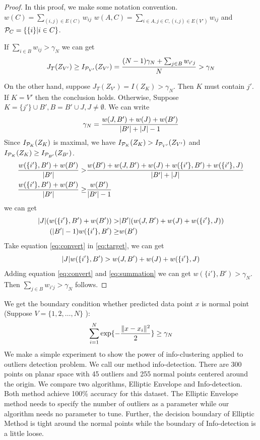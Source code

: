 \documentclass{article}
\begin{document}
\begin{proof}
	In this proof, we make some notation convention.
	$w(C) = \sum_{(i,j) \in E(C)} w_{ij}$
	$w(A, C) = \sum_{i \in A, j \in C, (i,j) \in E(V')} w_{ij}$ and
	$\P_C = \{\{i \}| i \in C \}$.
	
	If $ \sum_{i \in B} w_{ij} > \gamma_N$ we can get
$$
J_{T}(Z_{V'}) \geq I_{\P_{V'}}(Z_{V'}) = \frac{(N-1)\gamma_N + \sum_{j \in B}w_{i'j}}{N} > \gamma_N
$$

On the other hand, suppose $J_{T}(Z_{V'}) = I(Z_K) > \gamma_N$. Then $K$ must contain $j'$. If $K=V'$ then the conclusion holds. Otherwise, Suppose $K = \{j'\} \cup B', B=B'\cup J, J\neq \emptyset$. We can write 
\begin{equation}
\gamma_N = \frac{w(J,B') + w(J) + w(B')}{ \abs{B'} + \abs{J} - 1 }
\end{equation}
Since $I_{\P_K}(Z_K)$ is maximal, we have $I_{\P_K}(Z_K) > I_{\P_{V'}}(Z_{V'})$ and $I_{\P_K}(Z_K) \geq I_{\P_{B'}}(Z_{B'})$.
\begin{align*}
	\frac{w(\{i'\}, B') + w(B')}{\abs{B'}} >& \frac{w(B') + w(J, B') + w(J) + w(\{i'\}, B') + w(\{i'\}, J)}{\abs{B'} + \abs{J}}  \\
	\frac{w(\{i'\}, B') + w(B')}{\abs{B'}} \geq & \frac{w(B')}{\abs{B'} - 1}
\end{align*}
we can get 
\begin{align}
\abs{J} (w(\{i'\}, B') + w(B')) > & \abs{B'} (w(J, B') + w(J) + w(\{i'\}, J)) \label{eq:target}
  \\
	(\abs{B'} - 1)  w(\{i'\}, B') \geq & w(B') \label{eq:convert}
\end{align}
Take equation \eqref{eq:convert} in \eqref{eq:target}, we can get
\begin{equation}\label{eq:summation}
	\abs{J} w(\{i'\}, B') > w(J, B') + w(J) + w(\{i'\}, J)
\end{equation}	
Adding equation \eqref{eq:convert} and \eqref{eq:summation} we can get
$w(\{i'\}, B') > \gamma_N$. Then $\sum_{j \in B}w_{i'j} > \gamma_N $ follows.
\end{proof}
We get the boundary condition whether predicted data point $x$ is normal point (Suppose $V=\{1,2,\dots, N \}$ ):
\begin{equation}
	\sum_{i=1}^N \exp\{ -\frac{\norm{x-x_i}^2}{2} \}	\geq \gamma_N
\end{equation}
We make a simple experiment to show the power of info-clustering applied to outliers detection problem. We call our method info-detection. There are 300 points on planar space with 45 outliers and 255 normal points centered around the origin. We compare two algorithms, Elliptic Envelope and Info-detection. Both method achieve 100\% accuracy for this dataset. The Elliptic Envelope method needs to specify the number of outliers as a parameter while our algorithm needs no parameter to tune.  Further, the decision boundary of Elliptic Method is tight around the normal points while the boundary of Info-detection is a little loose.
\end{document}
